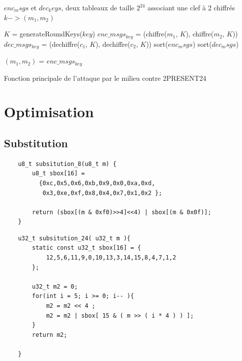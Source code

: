 \documentclass{report}
\begin{document}
\begin{algorithm}

    

    $enc_msgs$ et $dec_keys$, deux tableaux de taille $2^{24}$ associant une clef à 2 chiffrés $k->(m_{1}, m_{2})$ \;

      {
        $K$ = generateRoundKeys($key$)\;
        $enc\_msgs_{key}$ = (chiffre($m_{1}$, $K$), chiffre($m_{2}$, $K$)) \;
        $dec\_msgs_{key}$ = (dechiffre($c_{1}$, $K$), dechiffre($c_{2}$, $K$)) \;
      }
      \;
    sort($enc_msgs$)\;
    sort($dec_msgs$)\;
      \;
    {
        $(m_1, m_2)$ = $enc\_msgs_{key}$\;
    
    }


    \caption{Fonction principale de l'attaque par le milieu contre 2PRESENT24 }
\end{algorithm}



\chapter{Optimisation}
\section{ Substitution } 

\begin{lstlisting}
    u8_t subsitution_8(u8_t m) {
        u8_t sbox[16] =
          {0xc,0x5,0x6,0xb,0x9,0x0,0xa,0xd,
           0x3,0xe,0xf,0x8,0x4,0x7,0x1,0x2 };
        
        return (sbox[(m & 0xf0)>>4]<<4) | sbox[(m & 0x0f)];
    }
\end{lstlisting}

\begin{lstlisting}
    u32_t subsitution_24( u32_t m ){
        static const u32_t sbox[16] = {
            12,5,6,11,9,0,10,13,3,14,15,8,4,7,1,2
        };

        u32_t m2 = 0;
        for(int i = 5; i >= 0; i-- ){
            m2 = m2 << 4 ;
            m2 = m2 | sbox[ 15 & ( m >> ( i * 4 ) ) ];
        }
        return m2;

    }
\end{lstlisting}
\end{document}
